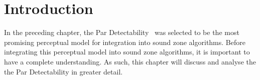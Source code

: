 \section{Introduction}
In the preceding chapter, the Par Detectability~\cite{van2005perceptual} was selected to be the most promising perceptual
model for integration into sound zone algorithms.
Before integrating this perceptual model into sound zone algorithms, it is important to have a complete understanding.
As such, this chapter will discuss and analyse the the Par Detectability in greater detail.


